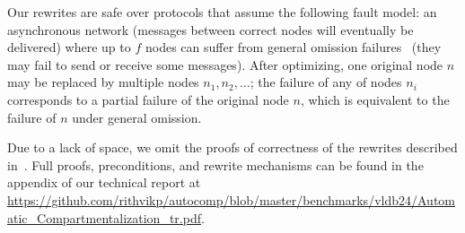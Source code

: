 



Our rewrites are safe over protocols that assume the following fault model:
an asynchronous network (messages between correct nodes will eventually be delivered) where up to $f$ nodes can suffer from
general omission failures~\cite{generalOmission} (they may fail to send or receive some messages).
After optimizing, one original node $n$ may be replaced by multiple nodes $n_1, n_2, \ldots$; the failure of any of nodes $n_i$ corresponds to a partial failure of the original node $n$, which is equivalent to the failure of $n$ under general omission.


{Due to a lack of space, we omit the proofs of correctness of the rewrites described in~.
Full proofs, preconditions, and rewrite mechanisms can be found in the appendix of our technical report at \url{https://github.com/rithvikp/autocomp/blob/master/benchmarks/vldb24/Automatic_Compartmentalization_tr.pdf}.}